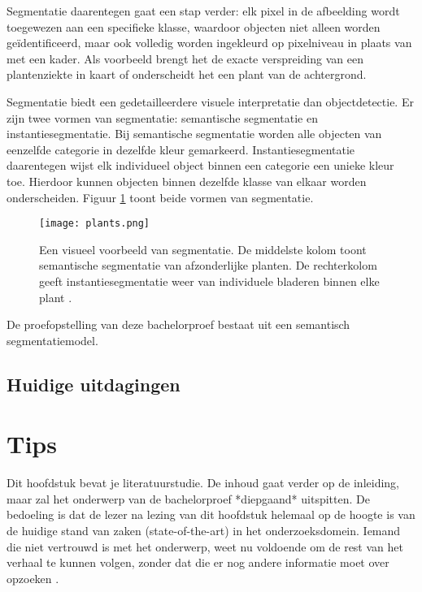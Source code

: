 Segmentatie daarentegen gaat een stap verder: elk pixel in de afbeelding wordt toegewezen aan een specifieke klasse, waardoor objecten niet alleen worden geïdentificeerd, maar ook volledig worden ingekleurd op pixelniveau in plaats van met een kader. Als voorbeeld brengt het de exacte verspreiding van een plantenziekte in kaart of onderscheidt het een plant van de achtergrond.
 
Segmentatie biedt een gedetailleerdere visuele interpretatie dan objectdetectie. Er zijn twee vormen van segmentatie: semantische segmentatie en instantiesegmentatie. Bij semantische segmentatie worden alle objecten van eenzelfde categorie in dezelfde kleur gemarkeerd. Instantiesegmentatie daarentegen wijst elk individueel object binnen een categorie een unieke kleur toe. Hierdoor kunnen objecten binnen dezelfde klasse van elkaar worden onderscheiden. Figuur \ref{fig:plants} toont beide vormen van segmentatie.

\begin{figure}
    \centering
    \texttt{[image: plants.png]}
    \caption[Voorbeeld segmentatie.]{\label{fig:plants}Een visueel voorbeeld van segmentatie. De middelste kolom toont semantische segmentatie van afzonderlijke planten. De rechterkolom geeft instantiesegmentatie weer van individuele bladeren binnen elke plant \autocite{Lei2024}.}
\end{figure}

De proefopstelling van deze bachelorproef bestaat uit een semantisch segmentatiemodel.

\subsection{Huidige uitdagingen}







\section{Tips}

Dit hoofdstuk bevat je literatuurstudie. De inhoud gaat verder op de inleiding, maar zal het onderwerp van de bachelorproef *diepgaand* uitspitten. De bedoeling is dat de lezer na lezing van dit hoofdstuk helemaal op de hoogte is van de huidige stand van zaken (state-of-the-art) in het onderzoeksdomein. Iemand die niet vertrouwd is met het onderwerp, weet nu voldoende om de rest van het verhaal te kunnen volgen, zonder dat die er nog andere informatie moet over opzoeken \autocite{Pollefliet2011}.

